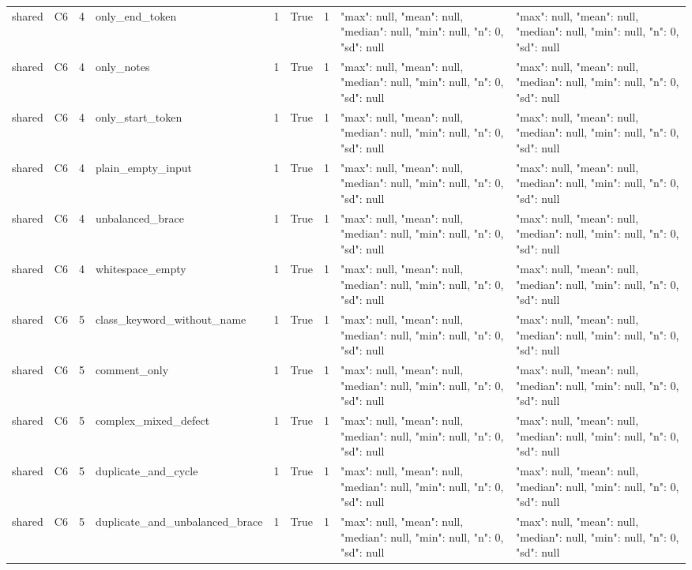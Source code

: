 \begin{tabular}{lllllllll}
shared & C6 & 4 & only\_end\_token & 1 & True & 1 & {"max": null, "mean": null, "median": null, "min": null, "n": 0, "sd": null} & {"max": null, "mean": null, "median": null, "min": null, "n": 0, "sd": null} \\
shared & C6 & 4 & only\_notes & 1 & True & 1 & {"max": null, "mean": null, "median": null, "min": null, "n": 0, "sd": null} & {"max": null, "mean": null, "median": null, "min": null, "n": 0, "sd": null} \\
shared & C6 & 4 & only\_start\_token & 1 & True & 1 & {"max": null, "mean": null, "median": null, "min": null, "n": 0, "sd": null} & {"max": null, "mean": null, "median": null, "min": null, "n": 0, "sd": null} \\
shared & C6 & 4 & plain\_empty\_input & 1 & True & 1 & {"max": null, "mean": null, "median": null, "min": null, "n": 0, "sd": null} & {"max": null, "mean": null, "median": null, "min": null, "n": 0, "sd": null} \\
shared & C6 & 4 & unbalanced\_brace & 1 & True & 1 & {"max": null, "mean": null, "median": null, "min": null, "n": 0, "sd": null} & {"max": null, "mean": null, "median": null, "min": null, "n": 0, "sd": null} \\
shared & C6 & 4 & whitespace\_empty & 1 & True & 1 & {"max": null, "mean": null, "median": null, "min": null, "n": 0, "sd": null} & {"max": null, "mean": null, "median": null, "min": null, "n": 0, "sd": null} \\
shared & C6 & 5 & class\_keyword\_without\_name & 1 & True & 1 & {"max": null, "mean": null, "median": null, "min": null, "n": 0, "sd": null} & {"max": null, "mean": null, "median": null, "min": null, "n": 0, "sd": null} \\
shared & C6 & 5 & comment\_only & 1 & True & 1 & {"max": null, "mean": null, "median": null, "min": null, "n": 0, "sd": null} & {"max": null, "mean": null, "median": null, "min": null, "n": 0, "sd": null} \\
shared & C6 & 5 & complex\_mixed\_defect & 1 & True & 1 & {"max": null, "mean": null, "median": null, "min": null, "n": 0, "sd": null} & {"max": null, "mean": null, "median": null, "min": null, "n": 0, "sd": null} \\
shared & C6 & 5 & duplicate\_and\_cycle & 1 & True & 1 & {"max": null, "mean": null, "median": null, "min": null, "n": 0, "sd": null} & {"max": null, "mean": null, "median": null, "min": null, "n": 0, "sd": null} \\
shared & C6 & 5 & duplicate\_and\_unbalanced\_brace & 1 & True & 1 & {"max": null, "mean": null, "median": null, "min": null, "n": 0, "sd": null} & {"max": null, "mean": null, "median": null, "min": null, "n": 0, "sd": null} \\

\end{tabular}
